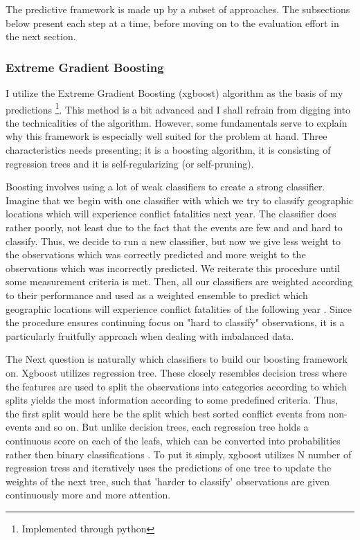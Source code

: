 \documentclass[a4paper]{article}
\begin{document}
The predictive framework is made up by a subset of approaches. The subsections below present each step at a time, before moving on to the evaluation effort in the next section.\par

\subsubsection{Extreme Gradient Boosting}

I utilize the Extreme Gradient Boosting (xgboost) algorithm as the basis of my predictions \citep{Chen_2016}\footnote{Implemented through python}. This method is a bit advanced and I shall refrain from digging into the technicalities of the algorithm. However, some fundamentals serve to explain why this framework is especially well suited for the problem at hand. Three characteristics needs presenting; it is a boosting algorithm, it is consisting of regression trees and it is self-regularizing (or self-pruning).

Boosting involves using a lot of weak classifiers to create a strong classifier. Imagine that we begin with one classifier with which we try to classify geographic locations which will experience conflict fatalities next year. The classifier does rather poorly, not least due to the fact that the events are few and and hard to classify. Thus, we decide to run a new classifier, but now we give less weight to the observations which was correctly predicted and more weight to the observations which was incorrectly predicted. We reiterate this procedure until some measurement criteria is met. Then, all our classifiers are weighted according to their performance and used as a weighted ensemble to predict which geographic locations will experience conflict fatalities of the following year \citep[338-339]{Friedman_2001}. Since the procedure ensures continuing focus on "hard to classify" observations, it is a particularly fruitfully approach when dealing with imbalanced data.\par

The Next question is naturally which classifiers to build our boosting framework on. Xgboost utilizes regression tree. These closely resembles decision tress where the features are used to split the observations into categories according to which splits yields the most information according to some predefined criteria. Thus, the first split would here be the split which best sorted conflict events from non-events and so on. But unlike decision trees, each regression tree holds a continuous score on each of the leafs, which can be converted into probabilities rather then binary classifications \citep[2]{Chen_2016}. To put it simply, xgboost utilizes N number of regression tress and iteratively uses the predictions of one tree to update the weights of the next tree, such that 'harder to classify' observations are given continuously more and more attention.\par
\end{document}
